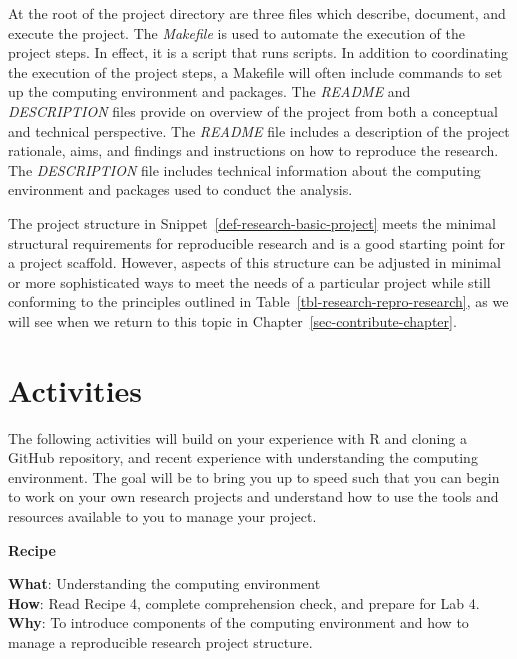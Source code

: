 \documentclass[
  letterpaper,
  krantz1]{latex/krantz-mod}
\theoremstyle{definition}
\theoremstyle{definition}
\theoremstyle{remark}
\begin{document}
At the root of the project directory are three files which describe,
document, and execute the project. The \emph{Makefile}
is used to automate the execution of the project steps. In effect, it is
a script that runs scripts. In addition to coordinating the execution of
the project steps, a Makefile will often include commands to set up the
computing environment and packages. The \emph{README}
and \emph{DESCRIPTION} files provide on overview
of the project from both a conceptual and technical perspective. The
\emph{README} file includes a description of the project rationale,
aims, and findings and instructions on how to reproduce the research.
The \emph{DESCRIPTION} file includes technical information about the
computing environment and packages used to conduct the analysis.

The project structure in Snippet~\ref{def-research-basic-project} meets
the minimal structural requirements for reproducible research and is a
good starting point for a project scaffold. However, aspects of this
structure can be adjusted in minimal or more sophisticated ways to meet
the needs of a particular project while still conforming to the
principles outlined in Table~\ref{tbl-research-repro-research}, as we
will see when we return to this topic in
Chapter~\ref{sec-contribute-chapter}.

\section*{Activities}\label{activities-2}


The following activities will build on your experience with R and
cloning a GitHub repository, and recent experience with understanding
the computing environment. The goal will be to bring you up to speed
such that you can begin to work on your own research projects and
understand how to use the tools and resources available to you to manage
your project.

\begin{tcolorbox}[enhanced jigsaw, toprule=.15mm, breakable, colback=white, arc=.35mm, left=2mm, colframe=quarto-callout-color-frame, opacityback=0, bottomrule=.15mm, rightrule=.15mm, leftrule=.75mm]

\textbf{ Recipe}

\textbf{What}: Understanding the computing environment\\
\textbf{How}: Read Recipe 4, complete comprehension check, and prepare
for Lab 4.\\
\textbf{Why}: To introduce components of the computing environment and
how to manage a reproducible research project structure.

\end{tcolorbox}
\end{document}
